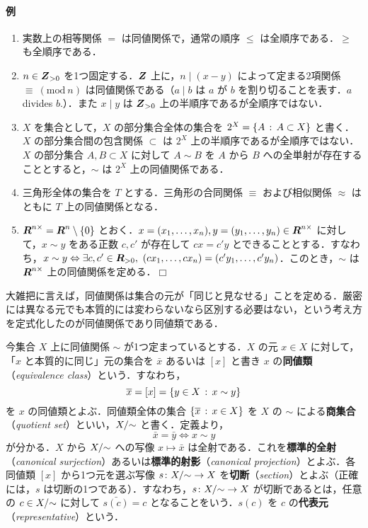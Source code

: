 \documentclass[pandoc,base=10pt,b5j,precisetext]{bxjsarticle}
\providecommand{\tightlist}{%
  \setlength{\itemsep}{0pt}\setlength{\parskip}{0pt}}
\let\oldparagraph\paragraph
\renewcommand{\paragraph}[1]{\oldparagraph{#1}\mbox{}}
\begin{document}
\hypertarget{ux4f8b-2}{%
\paragraph{例}\label{ux4f8b-2}}

\begin{enumerate}
\def\labelenumi{\roman{enumi})}
\tightlist
\item
  実数上の相等関係 \(=\) は同値関係で，通常の順序 \(\le\)
  は全順序である．\(\ge\) も全順序である．
\item
  \(n \in \boldsymbol{Z}_{> 0}\) を1つ固定する．\(\boldsymbol{Z}\)
  上に，\(n \mid (x - y)\) によって定まる2項関係
  \(\equiv \ (\mathrm{mod}\ n)\) は同値関係である（\(a \mid b\) は \(a\)
  が \(b\) を割り切ることを表す．\(a\) divides \(b\).）．また
  \(x \mid y\) は \(\boldsymbol{Z}_{> 0}\) 上の半順序であるが全順序ではない．
\item
  \(X\) を集合として，\(X\) の部分集合全体の集合を
  \(2^X = \{ A \,:\, A \subset X \}\) と書く．\(X\)
  の部分集合間の包含関係 \(\subset\) は \(2^X\)
  上の半順序であるが全順序ではない．\(X\) の部分集合 \(A, B \subset X\)
  に対して \(A \sim B\) を \(A\) から \(B\)
  への全単射が存在することとすると，\(\sim\) は \(2^X\)
  上の同値関係である．
\item
  三角形全体の集合を \(T\) とする．三角形の合同関係 \(\equiv\)
  および相似関係 \(\approx\) はともに \(T\) 上の同値関係となる．
\item
  \(\boldsymbol{R}^{n\times} = \boldsymbol{R}^n \setminus \{0\}\)
  とおく．\(x = (x_1, \dotsc, x_n), y = (y_1, \dotsc, y_n) \in \boldsymbol{R}^{n \times}\)
  に対して，\(x \sim y\) をある正数 \(c, c'\) が存在して \(cx = c'y\)
  とできることとする．すなわち，\(x \sim y \Leftrightarrow \exists c, c' \in \boldsymbol{R}_{> 0},\ (c x_1, \dotsc, c x_n) = (c' y_1, \dotsc, c' y_n)\)．このとき，\(\sim\)
  は \(\boldsymbol{R}^{n \times}\) 上の同値関係を定める．\(\Box\)
\end{enumerate}

大雑把に言えば，同値関係は集合の元が「同じと見なせる」ことを定める．厳密には異なる元でも本質的には変わらないなら区別する必要はない，という考え方を定式化したのが同値関係であり同値類である．

今集合 \(X\) 上に同値関係 \(\sim\) が1つ定まっているとする．\(X\) の元
\(x \in X\) に対して，「\(x\) と本質的に同じ」元の集合を \(\bar x\)
あるいは \([x]\) と書き \(x\) の\textbf{同値類}（\emph{equivalence
class}）という．すなわち， \[
\overline{x} = [x] = \{ y \in X \,:\, x \sim y \}
\] を \(x\) の同値類とよぶ．同値類全体の集合
\(\{ \overline{x} \,:\, x \in X \}\) を \(X\) の \(\sim\)
による\textbf{商集合}（\emph{quotient set}）といい，\({X}/\!\,{\sim}\)
と書く．定義より， \[
\bar x = \bar y \Longleftrightarrow x \sim y
\] が分かる．\(X\) から \({X}/\!\,{\sim}\) への写像 \(x \mapsto \bar x\)
は全射である．これを\textbf{標準的全射}（\emph{canonical
surjection}）あるいは\textbf{標準的射影}（\emph{canonical
projection}）とよぶ．各同値類 \([x]\) から1つ元を選ぶ写像
\(s \colon {X}/\!\,{\sim} \to X\)
を\textbf{切断}（\emph{section}）とよぶ（正確には，\(s\)
は切断の1つである）．すなわち，\(s \colon {X}/\!\,{\sim} \to X\)
が切断であるとは，任意の \(c \in {X}/\!\,{\sim}\) に対して
\(\bar{s(c)} = c\) となることをいう．\(s(c)\) を \(c\)
の\textbf{代表元}（\emph{representative}）という．
\end{document}
